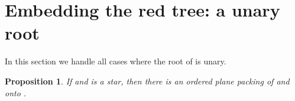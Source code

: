 \documentclass[11pt,a4paper,colorlinks=true,urlcolor=blue,citecolor=red]{article}
\theoremstyle{plain}
\newtheorem{proposition}[theorem]{Proposition}
\begin{document}
\section{Embedding the red tree: a unary root}\label{subsec:rec_unary}

In this section we handle all cases where the root  of  is unary.

\begin{proposition}\label{prop:rec_unary_star}
  If  and  is a star, then there is an ordered plane
  packing of  and  onto .
\end{proposition}
\end{document}
